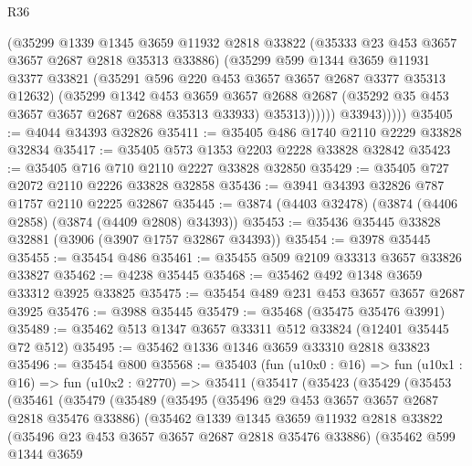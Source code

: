 \begin{lexlean}{R36}
\begin{coremodule}
                    (@35299
                      @1339
                      @1345
                      @3659
                      @11932
                      @2818
                      @33822
                      (@35333 @23 @453 @3657 @3657 @2687 @2818 @35313 @33886)
                      (@35299
                        @599
                        @1344
                        @3659
                        @11931
                        @3377
                        @33821
                        (@35291 @596 @220 @453 @3657 @3657 @2687 @3377 @35313 @12632)
                        (@35299
                          @1342
                          @453
                          @3659
                          @3657
                          @2688
                          @2687
                          (@35292 @35 @453 @3657 @3657 @2687 @2688 @35313 @33933)
                          @35313))))))
              @33943)))))
@35405 := @4044 @34393 @32826
@35411 := @35405 @486 @1740 @2110 @2229 @33828 @32834
@35417 := @35405 @573 @1353 @2203 @2228 @33828 @32842
@35423 := @35405 @716 @710 @2110 @2227 @33828 @32850
@35429 := @35405 @727 @2072 @2110 @2226 @33828 @32858
@35436 := @3941 @34393 @32826 @787 @1757 @2110 @2225 @32867
@35445 := @3874 (@4403 @32478) (@3874 (@4406 @2858) (@3874 (@4409 @2808) @34393))
@35453 := @35436 @35445 @33828 @32881 (@3906 (@3907 @1757 @32867 @34393))
@35454 := @3978 @35445
@35455 := @35454 @486
@35461 := @35455 @509 @2109 @33313 @3657 @33826 @33827
@35462 := @4238 @35445
@35468 := @35462 @492 @1348 @3659 @33312 @3925 @33825
@35475 := @35454 @489 @231 @453 @3657 @3657 @2687 @3925
@35476 := @3988 @35445
@35479 := @35468 (@35475 @35476 @3991)
@35489 := @35462 @513 @1347 @3657 @33311 @512 @33824 (@12401 @35445 @72 @512)
@35495 := @35462 @1336 @1346 @3659 @33310 @2818 @33823
@35496 := @35454 @800
@35568 := @35403
    (fun (u10x0 : @16) =>
    fun (u10x1 : @16) =>
    fun (u10x2 : @2770) =>
    @35411
      (@35417
        (@35423
          (@35429
            (@35453
              (@35461
                (@35479
                  (@35489
                    (@35495
                      (@35496 @29 @453 @3657 @3657 @2687 @2818 @35476 @33886)
                      (@35462
                        @1339
                        @1345
                        @3659
                        @11932
                        @2818
                        @33822
                        (@35496 @23 @453 @3657 @3657 @2687 @2818 @35476 @33886)
                        (@35462
                          @599
                          @1344
                          @3659

\end{coremodule}
\end{lexlean}

